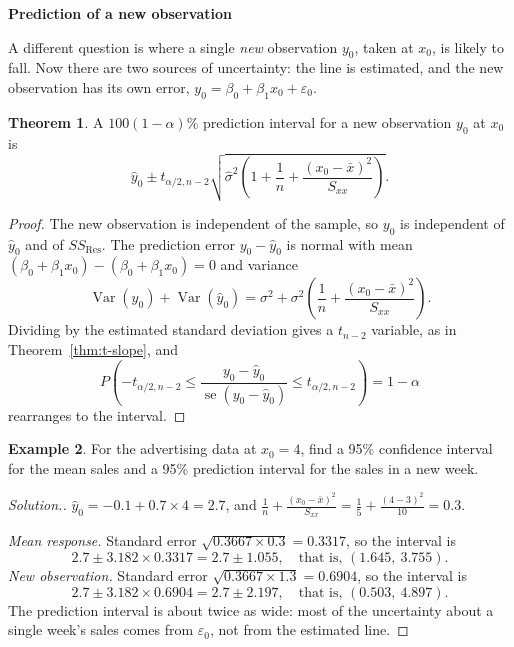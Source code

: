\documentclass[11pt,a4paper]{article}
\numberwithin{equation}{section}
\theoremstyle{definition}
\newtheorem{thm}{Theorem}[subsection]
\newtheorem{exa}[thm]{Example}
\newenvironment{solution}
  {\renewcommand{\qedsymbol}{}\begin{proof}[\textit{Solution}.]}
  {\end{proof}}
\newcommand{\subhead}[1]{%
  \par\medskip\noindent\textbf{#1}\par\nobreak\smallskip}
\begin{document}
\subhead{Prediction of a new observation}
A different question is where a single \emph{new} observation $y_0$, taken at $x_0$, is likely
to fall. Now there are two sources of uncertainty: the line is estimated, and the new
observation has its own error, $y_0 = \beta_0 + \beta_1 x_0 + \varepsilon_0$.

\begin{thm}\label{thm:prediction}
A $100(1-\alpha)\%$ prediction interval for a new observation $y_0$ at $x_0$ is
\[
\hat y_0 \pm t_{\alpha/2, n-2} \sqrt{\hat\sigma^2 \left( 1 + \frac1n + \frac{(x_0 - \bar x)^2}{S_{xx}} \right)} .
\]
\end{thm}

\begin{proof}
The new observation is independent of the sample, so $y_0$ is independent of $\hat y_0$ and
of $SS_{\mathrm{Res}}$. The prediction error $y_0 - \hat y_0$ is normal with mean
$(\beta_0 + \beta_1 x_0) - (\beta_0 + \beta_1 x_0) = 0$ and variance
\[
\operatorname{Var}(y_0) + \operatorname{Var}(\hat y_0) = \sigma^2 + \sigma^2 \left( \frac1n + \frac{(x_0 - \bar x)^2}{S_{xx}} \right) .
\]
Dividing by the estimated standard deviation gives a $t_{n-2}$ variable, as in
Theorem~\ref{thm:t-slope}, and
\[
P\left(-t_{\alpha/2,n-2} \le \frac{y_0 - \hat y_0}{\operatorname{se}(y_0 - \hat y_0)} \le t_{\alpha/2,n-2}\right) = 1 - \alpha
\]
rearranges to the interval.
\end{proof}

\begin{exa}\label{exa:disney-pi}
For the advertising data at $x_0 = 4$, find a 95\% confidence interval for the mean sales and a
95\% prediction interval for the sales in a new week.
\end{exa}

\begin{solution}
$\hat y_0 = -0.1 + 0.7 \times 4 = 2.7$, and
$\frac1n + \frac{(x_0 - \bar x)^2}{S_{xx}} = \frac15 + \frac{(4-3)^2}{10} = 0.3$.

\emph{Mean response.} Standard error $\sqrt{0.3667 \times 0.3} = 0.3317$, so the interval is
\[
2.7 \pm 3.182 \times 0.3317 = 2.7 \pm 1.055, \quad\text{that is, } (1.645,\ 3.755) .
\]
\emph{New observation.} Standard error $\sqrt{0.3667 \times 1.3} = 0.6904$, so the interval is
\[
2.7 \pm 3.182 \times 0.6904 = 2.7 \pm 2.197, \quad\text{that is, } (0.503,\ 4.897) .
\]
The prediction interval is about twice as wide: most of the uncertainty about a single week's
sales comes from $\varepsilon_0$, not from the estimated line.
\end{solution}
\end{document}
